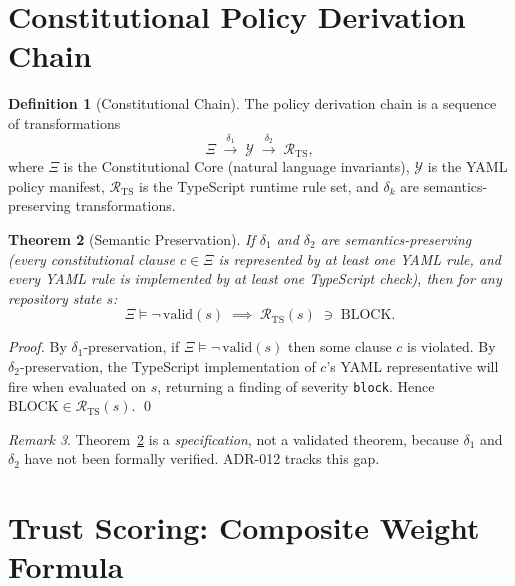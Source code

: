 \documentclass[12pt,a4paper]{article}
\newtheorem{theorem}{Theorem}[section]
\theoremstyle{definition}
\newtheorem{definition}[theorem]{Definition}
\theoremstyle{remark}
\newtheorem{remark}[theorem]{Remark}
\begin{document}
\section{Constitutional Policy Derivation Chain}
\label{sec:const}

\begin{definition}[Constitutional Chain]
The policy derivation chain is a sequence of transformations
\[
  \Xi \;\xrightarrow{\;\delta_1\;}\; \mathcal{Y} \;\xrightarrow{\;\delta_2\;}\; \mathcal{R}_{\mathrm{TS}},
\]
where $\Xi$ is the Constitutional Core (natural language invariants),
$\mathcal{Y}$ is the YAML policy manifest,
$\mathcal{R}_{\mathrm{TS}}$ is the TypeScript runtime rule set,
and $\delta_k$ are semantics-preserving transformations.
\end{definition}

\begin{theorem}[Semantic Preservation]
\label{thm:chain}
If $\delta_1$ and $\delta_2$ are semantics-preserving (every constitutional clause
$c\in\Xi$ is represented by at least one YAML rule, and every YAML rule is
implemented by at least one TypeScript check), then for any repository state $s$:
\begin{equation}
  \Xi \models \neg\,\mathrm{valid}(s)
  \;\implies\;
  \mathcal{R}_{\mathrm{TS}}(s) \;\ni\; \mathrm{BLOCK}.
  \label{eq:chain}
\end{equation}
\end{theorem}

\begin{proof}
By $\delta_1$-preservation, if $\Xi \models \neg\,\mathrm{valid}(s)$ then some clause
$c$ is violated.  By $\delta_2$-preservation, the TypeScript implementation of $c$'s
YAML representative will fire when evaluated on $s$, returning a finding of
severity \texttt{block}.  Hence $\mathrm{BLOCK}\in\mathcal{R}_{\mathrm{TS}}(s)$. \qed
\end{proof}

\begin{remark}
Theorem~\ref{thm:chain} is a \emph{specification}, not a validated theorem, because
$\delta_1$ and $\delta_2$ have not been formally verified.  ADR-012 tracks this gap.
\end{remark}

\section{Trust Scoring: Composite Weight Formula}
\label{sec:trust}
\end{document}
